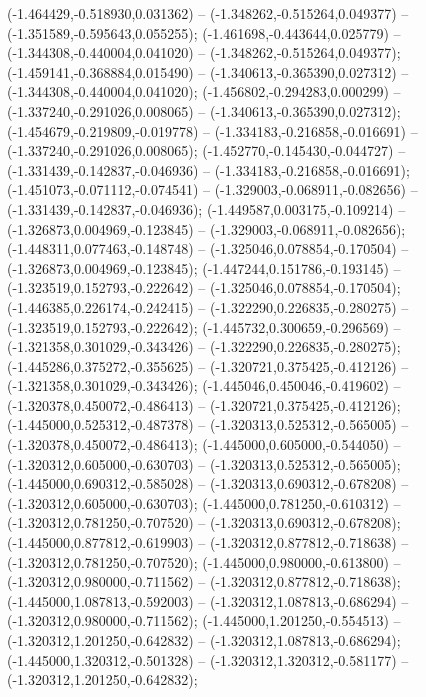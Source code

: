  (-1.464429,-0.518930,0.031362) -- (-1.348262,-0.515264,0.049377) -- (-1.351589,-0.595643,0.055255);
 (-1.461698,-0.443644,0.025779) -- (-1.344308,-0.440004,0.041020) -- (-1.348262,-0.515264,0.049377);
 (-1.459141,-0.368884,0.015490) -- (-1.340613,-0.365390,0.027312) -- (-1.344308,-0.440004,0.041020);
 (-1.456802,-0.294283,0.000299) -- (-1.337240,-0.291026,0.008065) -- (-1.340613,-0.365390,0.027312);
 (-1.454679,-0.219809,-0.019778) -- (-1.334183,-0.216858,-0.016691) -- (-1.337240,-0.291026,0.008065);
 (-1.452770,-0.145430,-0.044727) -- (-1.331439,-0.142837,-0.046936) -- (-1.334183,-0.216858,-0.016691);
 (-1.451073,-0.071112,-0.074541) -- (-1.329003,-0.068911,-0.082656) -- (-1.331439,-0.142837,-0.046936);
 (-1.449587,0.003175,-0.109214) -- (-1.326873,0.004969,-0.123845) -- (-1.329003,-0.068911,-0.082656);
 (-1.448311,0.077463,-0.148748) -- (-1.325046,0.078854,-0.170504) -- (-1.326873,0.004969,-0.123845);
 (-1.447244,0.151786,-0.193145) -- (-1.323519,0.152793,-0.222642) -- (-1.325046,0.078854,-0.170504);
 (-1.446385,0.226174,-0.242415) -- (-1.322290,0.226835,-0.280275) -- (-1.323519,0.152793,-0.222642);
 (-1.445732,0.300659,-0.296569) -- (-1.321358,0.301029,-0.343426) -- (-1.322290,0.226835,-0.280275);
 (-1.445286,0.375272,-0.355625) -- (-1.320721,0.375425,-0.412126) -- (-1.321358,0.301029,-0.343426);
 (-1.445046,0.450046,-0.419602) -- (-1.320378,0.450072,-0.486413) -- (-1.320721,0.375425,-0.412126);
 (-1.445000,0.525312,-0.487378) -- (-1.320313,0.525312,-0.565005) -- (-1.320378,0.450072,-0.486413);
 (-1.445000,0.605000,-0.544050) -- (-1.320312,0.605000,-0.630703) -- (-1.320313,0.525312,-0.565005);
 (-1.445000,0.690312,-0.585028) -- (-1.320313,0.690312,-0.678208) -- (-1.320312,0.605000,-0.630703);
 (-1.445000,0.781250,-0.610312) -- (-1.320312,0.781250,-0.707520) -- (-1.320313,0.690312,-0.678208);
 (-1.445000,0.877812,-0.619903) -- (-1.320312,0.877812,-0.718638) -- (-1.320312,0.781250,-0.707520);
 (-1.445000,0.980000,-0.613800) -- (-1.320312,0.980000,-0.711562) -- (-1.320312,0.877812,-0.718638);
 (-1.445000,1.087813,-0.592003) -- (-1.320312,1.087813,-0.686294) -- (-1.320312,0.980000,-0.711562);
 (-1.445000,1.201250,-0.554513) -- (-1.320312,1.201250,-0.642832) -- (-1.320312,1.087813,-0.686294);
 (-1.445000,1.320312,-0.501328) -- (-1.320312,1.320312,-0.581177) -- (-1.320312,1.201250,-0.642832);
